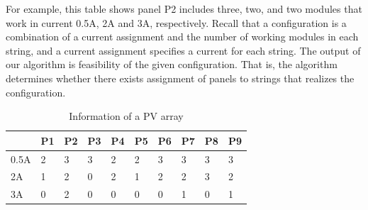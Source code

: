 \documentclass[conference]{IEEEtran}
\begin{document}
For example, this table shows panel P2 includes three, two, and two modules that work in current 0.5A, 2A and 3A, respectively. Recall that a configuration is a combination of a current assignment and the number of working modules in each string, and a current assignment specifies a current for each string. The output of our algorithm is feasibility of the given configuration. That is, the algorithm determines whether there exists assignment of panels to strings that realizes the configuration.
\begin{table}[htbp] 
\caption{Information of a PV array}
\begin{center}
\begin{tabular}{l|lllllllll}
    & P1 & P2 & P3 & P4 & P5 & P6 & P7 & P8 & P9 \\ \hline
0.5A & 2  & 3  & 3  & 2  & 2  & 3  & 3  & 3  & 3  \\
 2A & 1  & 2  & 0  & 2  & 1  & 2  & 2  & 3  & 2  \\
 3A & 0  & 2  & 0  & 0  & 0  & 0  & 1  & 0  & 1 
\end{tabular}\label{mpp3-1}
\end{center}
\end{table}  
\end{document}
